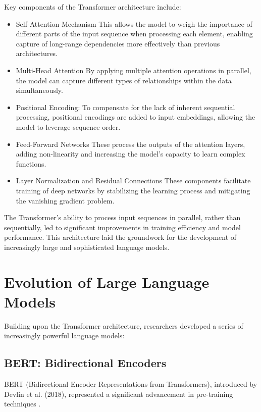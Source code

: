 \documentclass[logo,msc]{infthesis}           %
\begin{document}
Key components of the Transformer architecture include:
\begin{itemize}

 \item Self-Attention Mechanism This allows the model to weigh the importance of different parts of the input sequence when processing each element, enabling capture of long-range dependencies more effectively than previous architectures.

 \item Multi-Head Attention By applying multiple attention operations in parallel, the model can capture different types of relationships within the data simultaneously.
\item Positional Encoding: To compensate for the lack of inherent sequential processing, positional encodings are added to input embeddings, allowing the model to leverage sequence order.

 \item Feed-Forward Networks These process the outputs of the attention layers, adding non-linearity and increasing the model's capacity to learn complex functions.

 \item Layer Normalization and Residual Connections These components facilitate training of deep networks by stabilizing the learning process and mitigating the vanishing gradient problem.
\end{itemize}
The Transformer's ability to process input sequences in parallel, rather than sequentially, led to significant improvements in training efficiency and model performance. This architecture laid the groundwork for the development of increasingly large and sophisticated language models.

\section{Evolution of Large Language Models}

Building upon the Transformer architecture, researchers developed a series of increasingly powerful language models:

\subsection*{BERT: Bidirectional Encoders}

BERT (Bidirectional Encoder Representations from Transformers), introduced by Devlin et al. (2018), represented a significant advancement in pre-training techniques \cite{devlin2019bertpretrainingdeepbidirectional}. 
\end{document}
